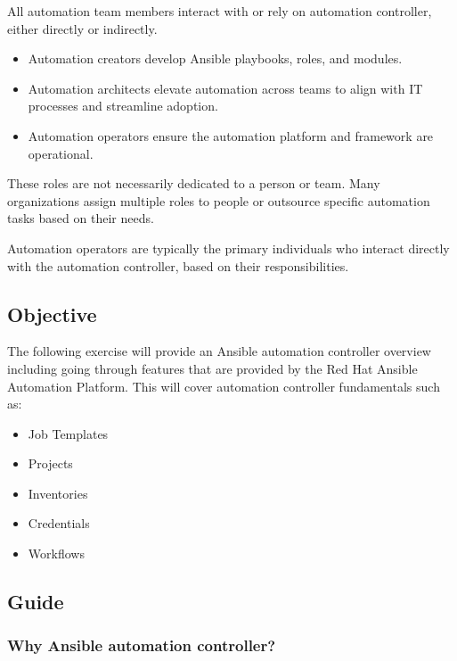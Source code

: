 All automation team members interact with or rely on automation
controller, either directly or indirectly.

\begin{itemize}
\tightlist
\item
  Automation creators develop Ansible playbooks, roles, and modules.
\item
  Automation architects elevate automation across teams to align with IT
  processes and streamline adoption.
\item
  Automation operators ensure the automation platform and framework are
  operational.
\end{itemize}

These roles are not necessarily dedicated to a person or team. Many
organizations assign multiple roles to people or outsource specific
automation tasks based on their needs.

Automation operators are typically the primary individuals who interact
directly with the automation controller, based on their
responsibilities.

\hypertarget{objective}{%
\subsection{Objective}\label{objective}}

The following exercise will provide an Ansible automation controller
overview including going through features that are provided by the Red
Hat Ansible Automation Platform. This will cover automation controller
fundamentals such as:

\begin{itemize}
\tightlist
\item
  Job Templates
\item
  Projects
\item
  Inventories
\item
  Credentials
\item
  Workflows
\end{itemize}

\hypertarget{guide}{%
\subsection{Guide}\label{guide}}

\hypertarget{why-ansible-automation-controller}{%
\subsubsection{Why Ansible automation
controller?}\label{why-ansible-automation-controller}}

